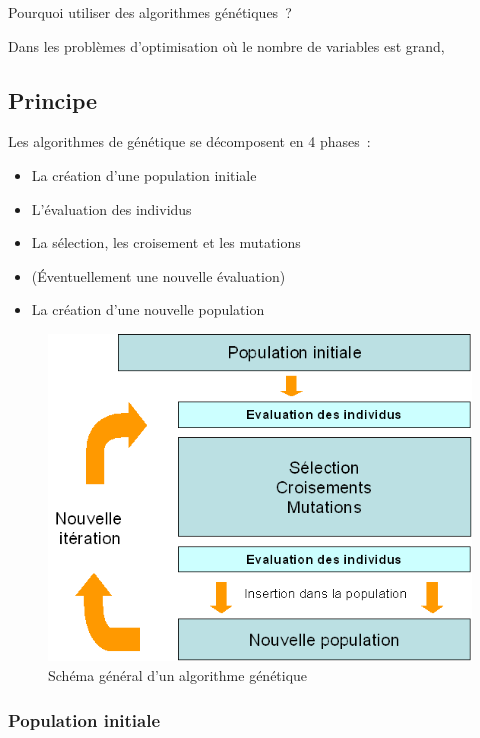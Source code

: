 \documentclass{article}
\begin{document}
	Pourquoi utiliser des algorithmes génétiques ?

	Dans les problèmes d'optimisation où le nombre de variables est grand, 

	\subsection{Principe}
	Les algorithmes de génétique se décomposent en 4 phases :
	\begin{itemize}
	\item La création d'une population initiale
	\item L'évaluation des individus
	\item La sélection, les croisement et les mutations
	\item (Éventuellement une nouvelle évaluation)
	\item La création d'une nouvelle population
	\end{itemize}

	\begin{figure}
		\begin{center}
			\includegraphics[scale=0.5]{schema_gen.png}
		\end{center}

		\caption{Schéma général d'un algorithme génétique}

		\label{Schéma général d'un algorithme génétique}
	\end{figure}


		\subsubsection{Population initiale}
\end{document}
